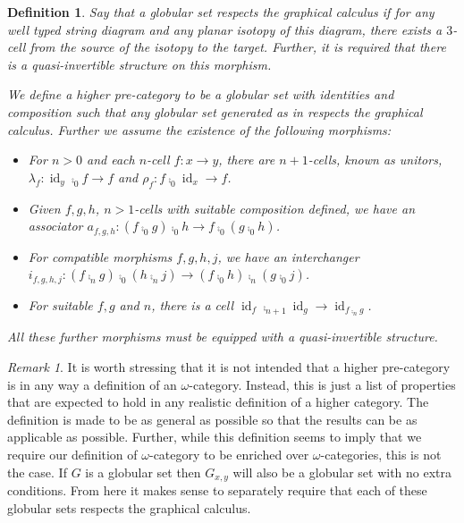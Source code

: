 \documentclass{article}
\newtheorem{definition}[theorem]{Definition} \theoremstyle{remark}
\newtheorem{remark}[theorem]{Remark} \newtheorem*{claim}{Claim}
\DeclareMathOperator{\id}{id}
\begin{document}
\begin{definition}\label{def:higher-cat}
  Say that a globular set \emph{respects the graphical calculus} if
  for any well typed string diagram and any planar isotopy of this
  diagram, there exists a \(3\)-cell from the source of the isotopy to
  the target. Further, it is required that there is a quasi-invertible
  structure on this morphism.

  We define a \emph{higher pre-category} to be a globular set with
  identities and composition such that any globular set
  generated as in  respects the graphical calculus.
  Further we assume the existence of the following morphisms:
  \begin{itemize}
  \item For \(n>0\) and each \(n\)-cell \(f: x \to y\), there are
    \(n+1\)-cells, known as unitors, \(\lambda_f: \id_y \comp_0 f \to
    f\) and \(\rho_f: f \comp_0 \id_x \to f\).
  \item Given \(f,g,h\), \(n>1\)-cells with suitable composition
    defined, we have an associator \(a_{f,g,h} : (f \comp_0 g) \comp_0
    h \to f \comp_0 (g \comp_0 h)\).
  \item For compatible morphisms \(f,g,h,j\), we have an interchanger
    \(i_{f,g,h,j} : (f \comp_n g) \comp_0 (h \comp_n j) \to (f \comp_0 h)
    \comp_n (g \comp_0 j)\).
  \item For suitable \(f,g\) and \(n\), there is a cell \(\id_f
    \comp_{n+1} \id_g \to \id_{f \comp_n g}\).
  \end{itemize}
  All these further morphisms must be equipped with a quasi-invertible
  structure.
\end{definition}

\begin{remark}
  It is worth stressing that it is not intended that a higher
  pre-category is in any way a definition of an \(\omega\)-category.
  Instead, this is just a list of properties that are expected to hold
  in any realistic definition of a higher category. The definition is
  made to be as general as possible so that the results can be as
  applicable as possible. Further, while this definition seems to imply that
  we require our definition of \(\omega\)-category to be enriched over
  \(\omega\)-categories, this is not the case. If \(G\) is a globular
  set then \(G_{x,y}\) will also be a globular set with no extra
  conditions. From here it makes sense to separately require that each
  of these globular sets respects the graphical calculus.
\end{remark}
\end{document}
